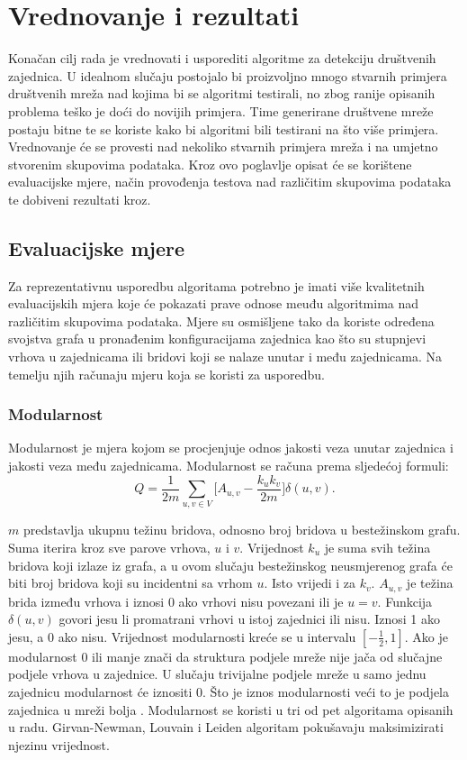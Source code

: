 \chapter{Vrednovanje i rezultati} \label{vrednovanja_i_rezultati}

Konačan cilj rada je vrednovati i usporediti algoritme za detekciju društvenih zajednica. U idealnom slučaju postojalo bi proizvoljno mnogo stvarnih primjera društvenih mreža nad kojima bi se algoritmi testirali, no zbog ranije opisanih problema teško je doći do novijih primjera. Time generirane društvene mreže postaju bitne te se koriste kako bi algoritmi bili testirani na što više primjera. Vrednovanje će se provesti nad nekoliko stvarnih primjera mreža i na umjetno stvorenim skupovima podataka. Kroz ovo poglavlje opisat će se korištene evaluacijske mjere, način provođenja testova nad različitim skupovima podataka te dobiveni rezultati kroz.

\section{Evaluacijske mjere}
Za reprezentativnu usporedbu algoritama potrebno je imati više kvalitetnih evaluacijskih mjera koje će pokazati prave odnose meuđu algoritmima nad različitim skupovima podataka. Mjere su osmišljene tako da koriste određena svojstva grafa u  pronađenim konfiguracijama zajednica kao što su stupnjevi vrhova u zajednicama ili bridovi koji se nalaze unutar i među zajednicama. Na temelju njih računaju mjeru koja se koristi za usporedbu. 


\subsection{Modularnost}
Modularnost je mjera kojom se procjenjuje odnos jakosti veza unutar zajednica i jakosti veza među zajednicama. Modularnost se računa prema sljedećoj formuli:
\begin{equation}
	Q = \frac{1}{2m} \sum_{u,v \in V} \bigg[ A_{u,v} - \frac{k_{u}k_{v}}{2m} \bigg] \delta(u,v).
\end{equation}

$m$ predstavlja ukupnu težinu bridova, odnosno broj bridova u bestežinskom grafu. Suma iterira kroz sve parove vrhova, $u$ i $v$. Vrijednost $k_{u}$ je suma svih težina bridova koji izlaze iz grafa, a u ovom slučaju bestežinskog neusmjerenog grafa će biti broj bridova koji su incidentni sa vrhom $u$. Isto vrijedi i za $k_{v}$. $A_{u,v}$ je težina brida između vrhova i iznosi 0 ako vrhovi nisu povezani ili je $u=v$. Funkcija $\delta(u,v)$ govori jesu li promatrani vrhovi u istoj zajednici ili nisu. Iznosi 1 ako jesu, a 0 ako nisu. Vrijednost modularnosti kreće se u intervalu $[ -\frac{1}{2}, 1 ]$. Ako je modularnost 0 ili manje znači da struktura podjele mreže nije jača od slučajne podjele vrhova u zajednice. U slučaju trivijalne podjele mreže u samo jednu zajednicu modularnost će iznositi 0. Što je iznos modularnosti veći to je podjela zajednica u mreži bolja \cite{brandes2007modularity}. Modularnost se koristi u tri od pet algoritama opisanih u radu. Girvan-Newman, Louvain i Leiden algoritam pokušavaju maksimizirati njezinu vrijednost.



